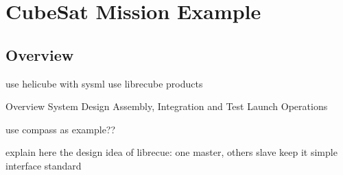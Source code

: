 \chapter{CubeSat Mission Example}

\section{Overview}


use helicube with sysml 
use librecube products


 Overview
 System Design
 Assembly, Integration and Test
 Launch
 Operations
  
 use compass as example??
  
explain here the design idea of librecue:
one master, others slave
keep it simple
interface standard